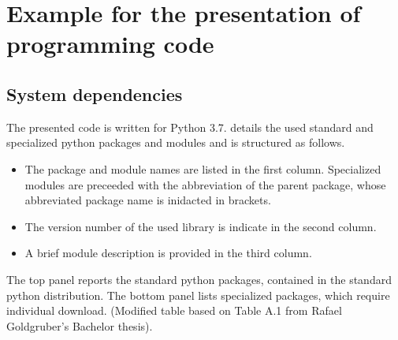 \chapter{Example for the presentation of programming code \label{chap:appendixCode}}


\section{System dependencies \label{sec:SystemDependencies}}
The presented code is written for Python 3.7. 
 details the used standard and specialized python packages and modules and is structured as follows. 
\begin{itemize}
\item The package and module names are listed in the first column. Specialized modules are preceeded with the abbreviation of the parent package, whose abbreviated package name is inidacted in brackets.

\item The version number of the used library is indicate in the second column.

\item A brief module description is provided in the third column. 
%
\end{itemize}
The top panel reports the standard python packages, contained in the standard python distribution. The bottom panel lists specialized packages, which require individual download. 
(Modified table based on Table A.1 from Rafael Goldgruber's Bachelor thesis).


